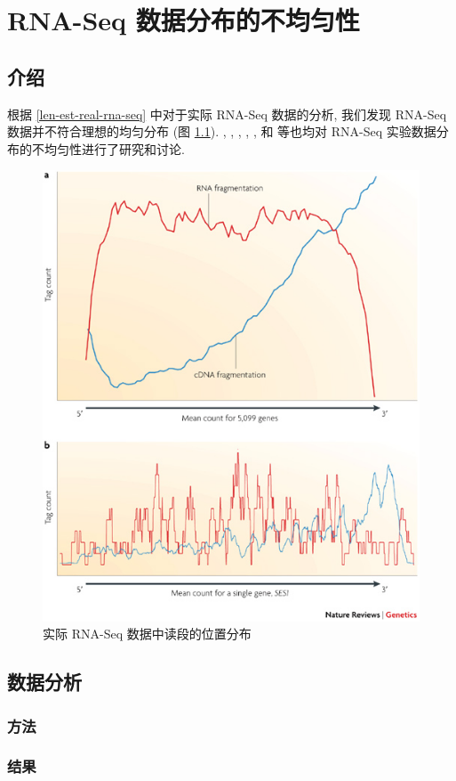 \chapter{RNA-Seq 数据分布的不均匀性}
\label{chap-rna-seq-nonunif}

\section{介绍}
根据 \ref{len-est-real-rna-seq} 中对于实际 RNA-Seq 数据的分析, 
我们发现 RNA-Seq 数据并不符合理想的均匀分布 (图 \ref{rna-seq-bias}). 
, , 
, , , 和
 等也均对 RNA-Seq 实验数据分布的不均匀性进行了研究和讨论. 

\begin{figure}[!t]
\centering
\includegraphics[width=\textwidth]{figures/nonunif/rna-seq-bias.jpg}
\caption{实际 RNA-Seq 数据中读段的位置分布 \cite{wang2009rna}}
\label{rna-seq-bias}
\end{figure}

\section{数据分析}

\subsection{方法}

\subsection{结果}



